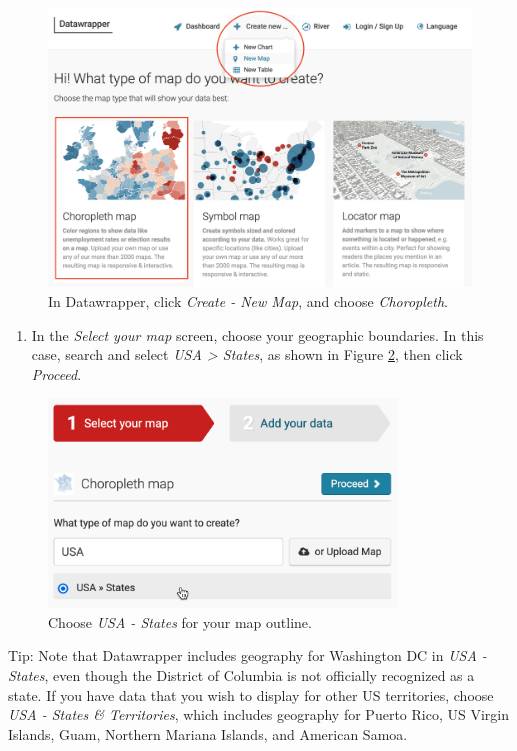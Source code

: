 \documentclass[
  english,
]{book}
\providecommand{\tightlist}{%
  \setlength{\itemsep}{0pt}\setlength{\parskip}{0pt}}
\begin{document}
\begin{figure}
\includegraphics[width=500px]{images/07-map/datawrapper-map-choose-annotated} \caption{In Datawrapper, click \emph{Create - New Map}, and choose \emph{Choropleth}.}\label{fig:datawrapper-map-choose}
\end{figure}

\begin{enumerate}
\def\labelenumi{\arabic{enumi}.}
\setcounter{enumi}{3}
\tightlist
\item
  In the \emph{Select your map} screen, choose your geographic boundaries. In this case, search and select \emph{USA \textgreater{} States}, as shown in Figure \ref{fig:datawrapper-map-us-states}, then click \emph{Proceed}.
\end{enumerate}



\begin{figure}
\includegraphics[width=350px]{images/07-map/datawrapper-map-us-states} \caption{Choose \emph{USA - States} for your map outline.}\label{fig:datawrapper-map-us-states}
\end{figure}

Tip: Note that Datawrapper includes geography for Washington DC in \emph{USA - States}, even though the District of Columbia is not officially recognized as a state. If you have data that you wish to display for other US territories, choose \emph{USA - States \& Territories}, which includes geography for Puerto Rico, US Virgin Islands, Guam, Northern Mariana Islands, and American Samoa.
\end{document}
